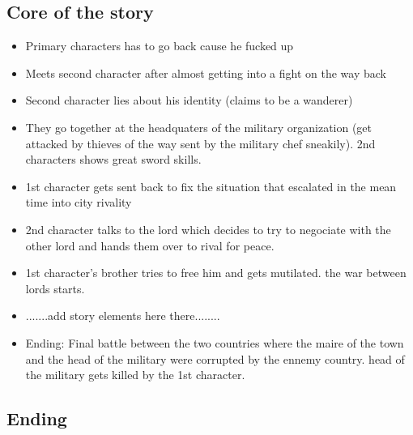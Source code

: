 \documentclass{article}
\begin{document}
	\subsection{Core of the story}
		\begin{itemize}
		\item{Primary characters has to go back cause he fucked up}
		\item{Meets second character after almost getting into a fight on the way back}
		\item{Second character lies about his identity (claims to be a wanderer)}
		\item{They go together at the headquaters of the military organization (get attacked by thieves of the way sent by the military chef sneakily). 2nd characters shows great sword skills.}
		\item{1st character gets sent back to fix the situation that escalated in the mean time into city rivality}
		\item{2nd character talks to the lord which decides to try to negociate with the other lord and hands them over to rival for peace.}
		\item{1st character's brother tries to free him and gets mutilated. the war between lords starts.}
		\item{.......add story elements here there........}
		\item{Ending: Final battle between the two countries where the maire of the town and the head of the military were corrupted by the ennemy country. head of the military gets killed by the 1st character.}

		\end{itemize}
	\subsection{Ending}
\end{document}
